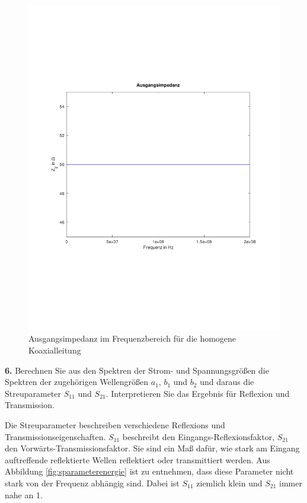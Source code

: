 \documentclass[Protokollheft.tex]{subfiles}
\begin{document}
\begin{figure}
	\centering
	\includegraphics[trim = 15mm 65mm 15mm 65mm, clip,width=0.7\linewidth]{Ausgangsimpedanz}
	\caption{Ausgangsimpedanz im Frequenzbereich für die homogene Koaxialleitung}
	\label{fig:ausgangsimpedanz}
\end{figure}

\begin{framed}
	\noindent \textbf{6.} Berechnen Sie aus den Spektren der Strom- und 
Spannungsgrößen die Spektren der zugehörigen Wellengrößen $a_1$,
$b_1$ und $b_2$ und daraus die Streuparameter $S_{11}$ und
$S_{21}$. Interpretieren Sie das Ergebnis für Reflexion und
Transmission.\label{exer:calcWaveQuantities}
\end{framed}
\noindent
Die Streuparameter beschreiben verschiedene Reflexions und Transmissionseigenschaften. $S_{11}$ beschreibt den Eingangs-Reflexionsfaktor, $S_{21}$ den Vorwärts-Transmissionsfaktor. Sie sind ein Maß dafür, wie stark am Eingang auftreffende reflektierte Wellen reflektiert oder transmittiert werden. Aus Abbildung \ref{fig:sparameterenergie} ist zu entnehmen, dass diese Parameter nicht stark von der Frequenz abhängig sind. Dabei ist $S_{11}$ ziemlich klein und $S_{21}$ immer nahe an 1.
\end{document}
